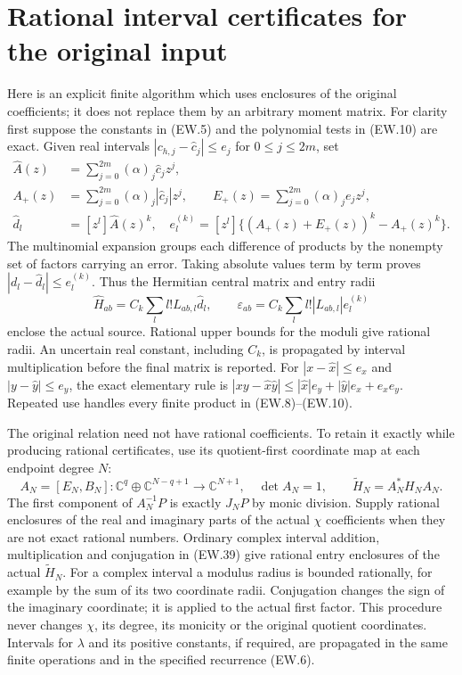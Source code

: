 \documentclass[11pt]{article}
\newcommand{\C}{\mathbb C}
\begin{document}
\section{Rational interval certificates for the original input}

Here is an explicit finite algorithm which uses enclosures of the
original coefficients; it does not replace them by an arbitrary moment
matrix. For clarity first suppose the constants in (EW.5) and the
polynomial tests in (EW.10) are exact. Given real intervals
$|c_{h,j}-\widehat c_j|\le e_j$ for $0\le j\le2m$, set
\[
 \begin{split}
 \widehat A(z)&=\sum_{j=0}^{2m}(\alpha)_j\widehat c_jz^j,\\
 A_+(z)&=\sum_{j=0}^{2m}(\alpha)_j|\widehat c_j|z^j,
 \qquad E_+(z)=\sum_{j=0}^{2m}(\alpha)_je_jz^j,\\
 \widehat d_l&=[z^l]\widehat A(z)^k,\quad
 e_l^{(k)}=[z^l]\{(A_+(z)+E_+(z))^k-A_+(z)^k\}.
 \end{split}                                                   \tag{EW.37}
\]
The multinomial expansion groups each difference of products by
the nonempty set of factors carrying an error. Taking absolute values
term by term proves $|d_l-\widehat d_l|\le e_l^{(k)}$.
Thus the Hermitian central matrix and entry radii
\[
 \widehat H_{ab}=C_k\sum_l l!L_{ab,l}\widehat d_l,\qquad
 \varepsilon_{ab}=C_k\sum_l l!|L_{ab,l}|e_l^{(k)}            \tag{EW.38}
\]
enclose the actual source. Rational upper bounds for the moduli give
rational radii. An uncertain real constant, including $C_k$, is
propagated by interval multiplication before the final matrix is
reported. For $|x-\widehat x|\le e_x$ and
$|y-\widehat y|\le e_y$, the exact elementary rule is
$|xy-\widehat x\widehat y|\le|\widehat x|e_y+
|\widehat y|e_x+e_xe_y$. Repeated use handles every finite
product in (EW.8)--(EW.10).

The original relation need not have rational coefficients. To retain
it exactly while producing rational certificates, use its quotient-first
coordinate map at each endpoint degree $N$:
\[
 A_N=[E_N,B_N]:\C^q\oplus\C^{N-q+1}\longrightarrow\C^{N+1},
 \quad\det A_N=1,\qquad\widetilde H_N=A_N^*H_NA_N.
                                                               \tag{EW.39}
\]
The first component of $A_N^{-1}P$ is exactly $J_NP$ by monic
division. Supply rational enclosures of the real and imaginary parts
of the actual $\chi$ coefficients when they are not exact rational
numbers. Ordinary complex interval addition, multiplication and
conjugation in (EW.39) give rational entry enclosures of the actual
$\widetilde H_N$. For a complex interval a modulus radius is
bounded rationally, for example by the sum of its two coordinate
radii. Conjugation changes the sign of the imaginary coordinate;
it is applied to the actual first factor. This procedure never
changes $\chi$, its degree, its monicity or the original quotient
coordinates. Intervals for $\lambda$ and its positive constants,
if required, are propagated in the same finite operations and in the
specified recurrence (EW.6).
\end{document}
